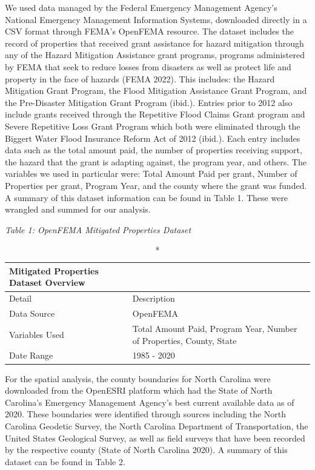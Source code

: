 \documentclass[
  12pt,
]{article}
\begin{document}
We used data managed by the Federal Emergency Management Agency's
National Emergency Management Information Systems, downloaded directly
in a CSV format through FEMA's OpenFEMA resource. The dataset includes
the record of properties that received grant assistance for hazard
mitigation through any of the Hazard Mitigation Assistance grant
programs, programs administered by FEMA that seek to reduce losses from
disasters as well as protect life and property in the face of hazards
(FEMA 2022). This includes: the Hazard Mitigation Grant Program, the
Flood Mitigation Assistance Grant Program, and the Pre-Disaster
Mitigation Grant Program (ibid.). Entries prior to 2012 also include
grants received through the Repetitive Flood Claims Grant program and
Severe Repetitive Loss Grant Program which both were eliminated through
the Biggert Water Flood Insurance Reform Act of 2012 (ibid.). Each entry
includes data such as the total amount paid, the number of properties
receiving support, the hazard that the grant is adapting against, the
program year, and others. The variables we used in particular were:
Total Amount Paid per grant, Number of Properties per grant, Program
Year, and the county where the grant was funded. A summary of this
dataset information can be found in Table 1. These were wrangled and
summed for our analysis.

\emph{Table 1: OpenFEMA Mitigated Properties Dataset}
\captionsetup[table]{labelformat=empty,skip=1pt}

\begin{longtable}{ll}
\caption*{
{\large Mitigated Properties Dataset Overview}
} \\ 
\toprule
Detail & Description \\ 
\midrule
Data Source & OpenFEMA \\ 
Variables Used & Total Amount Paid, Program Year, Number of Properties, County, State  \\ 
Date Range & 1985 - 2020 \\ 
\bottomrule
\end{longtable}

For the spatial analysis, the county boundaries for North Carolina were
downloaded from the OpenESRI platform which had the State of North
Carolina's Emergency Management Agency's best current available data as
of 2020. These boundaries were identified through sources including the
North Carolina Geodetic Survey, the North Carolina Department of
Transportation, the United States Geological Survey, as well as field
surveys that have been recorded by the respective county (State of North
Carolina 2020). A summary of this dataset can be found in Table 2.
\newpage
\end{document}
